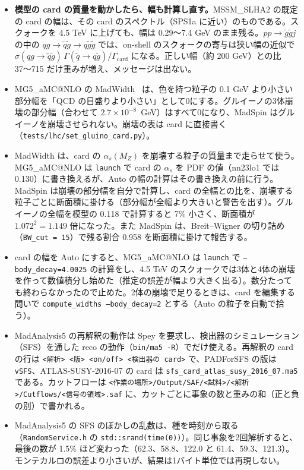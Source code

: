 \documentclass[a4paper,10pt]{ltjsarticle}
\makeatletter
\newcommand{\MGaMC}{MG5\_aMC@NLO}
\makeatother
\begin{document}
\begin{itemize}
\item \textbf{模型の card の質量を動かしたら、幅も計算し直す。}MSSM\_SLHA2 の既定の card の幅は、その card のスペクトル（SPS1a に近い）のものである。スクォークを 4.5 TeV に上げても、幅は 0.29〜7.4 GeV のまま残る。$pp\to\tilde g\tilde g j$ の中の $qg\to\tilde q\tilde g\to q\tilde g\tilde g$ では、on-shell のスクォークの寄与は狭い幅の近似で $\sigma(qg\to\tilde q\tilde g)\,\Gamma(\tilde q\to q\tilde g)/\Gamma_{\mathrm{card}}$ になる。正しい幅（約 200 GeV）との比 37〜715 だけ重みが増え、メッセージは出ない。
\item \MGaMC{} の MadWidth~\cite{madwidth} は、色を持つ粒子の 0.1 GeV より小さい部分幅を「QCD の目盛りより小さい」として0にする。グルイーノの3体崩壊の部分幅（合わせて $2.7\times10^{-8}$~GeV）はすべて0になり、MadSpin はグルイーノを崩壊させられない。崩壊の表は card に直接書く（\nolinkurl{tests/lhc/set_gluino_card.py}）。
\item MadWidth は、card の $\alpha_s(M_Z)$ を崩壊する粒子の質量まで走らせて使う。\MGaMC{} は \texttt{launch} で card の $\alpha_s$ を PDF の値（nn23lo1 では 0.130）に書き換えるが、Auto の幅の計算はその書き換えの前に行う。MadSpin は崩壊の部分幅を自分で計算し、card の全幅との比を、崩壊する粒子ごとに断面積に掛ける（部分幅が全幅より大きいと警告を出す）。グルイーノの全幅を模型の 0.118 で計算すると 7\% 小さく、断面積が $1.072^2=1.149$ 倍になった。また MadSpin は、Breit--Wigner の切り詰め（\texttt{BW\_cut = 15}）で残る割合 0.958 を断面積に掛けて報告する。
\item card の幅を Auto にすると、\MGaMC{} は \texttt{launch} で \texttt{--body\_decay=4.0025} の計算をし、4.5 TeV のスクォークでは3体と4体の崩壊を作って数値積分し始めた（推定の誤差が幅より大きく出る）。数分たっても終わらなかったので止めた。2体の崩壊で足りるときは、card を編集する問いで \texttt{compute\_widths --body\_decay=2} とする（Auto の粒子を自動で拾う）。
\item MadAnalysis5 の再解釈の動作は Spey を要求し、検出器のシミュレーション（SFS）を通した reco の動作（\texttt{bin/ma5 -R}）でだけ使える。再解釈の card の行は \texttt{<解析> <版> <on/off> <検出器の card>} で、PADForSFS の版は \texttt{vSFS}、ATLAS-SUSY-2016-07 の card は \texttt{sfs\_card\_atlas\_susy\_2016\_07.ma5} である。カットフローは \texttt{<作業の場所>/Output/SAF/<試料>/<解析>/Cutflows/<信号の領域>.saf} に、カットごとに事象の数と重みの和（正と負の別）で書かれる。
\item MadAnalysis5 の SFS のぼかしの乱数は、種を時刻から取る（\texttt{RandomService.h} の \texttt{std::srand(time(0))}）。同じ事象を2回解析すると、最後の数が 1.5\% ほど変わった（62.3、58.8、122.0 と 61.4、59.3、121.3）。モンテカルロの誤差より小さいが、結果は1バイト単位では再現しない。

\end{itemize}
\end{document}
